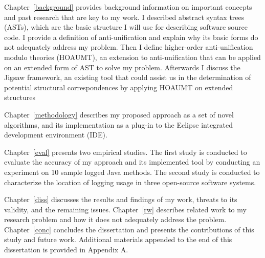 Chapter~\ref{background} provides background information on important concepts and past research that are key to my work.  I described abstract syntax trees (ASTs), which are the basic structure I will use for describing software source code. I provide a definition of anti-unification and explain why its basic forms do not adequately address my problem. Then I define higher-order anti-unification modulo theories (HOAUMT), an extension to anti-unification that can be applied on an extended form of AST to solve my problem. Afterwards I discuss the Jigsaw framework, an existing tool that could assist us in the determination of potential structural correspondences by applying HOAUMT on extended structures

Chapter~\ref{methodology} describes my proposed approach as a set of novel algorithms, and its implementation as a plug-in to the Eclipse integrated development environment (IDE).

Chapter~\ref{eval} presents two empirical studies. The first study is conducted to evaluate the accuracy of my approach and its implemented tool by conducting an experiment on 10 sample logged Java methods. The second study is conducted to characterize the location of logging usage in three open-source software systems.

Chapter~\ref{diss} discusses the results and findings of my work, threats to its validity, and the remaining issues. Chapter~\ref{rw} describes related work to my research problem and how it does not adequately address the problem. Chapter~\ref{conc} concludes the dissertation and presents the contributions of this study and future work. Additional materials appended to the end of this dissertation is provided in Appendix A.


